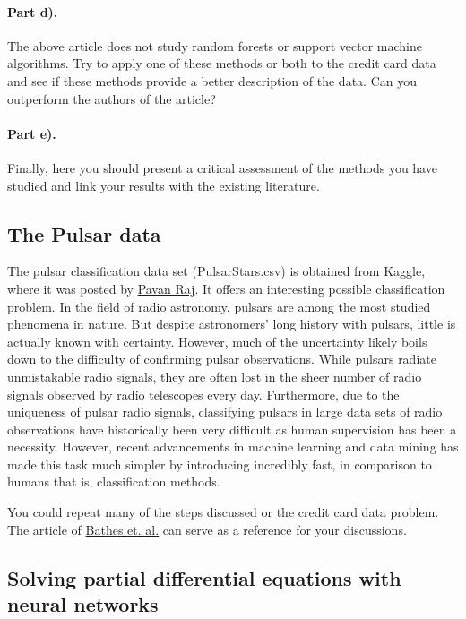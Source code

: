 \documentclass[%
oneside,                 %
final,                   %
10pt]{article}
\begin{document}
\paragraph{Part d).}
The above article does not study random forests or support vector machine algorithms. Try to apply one of these methods or both to the credit card data and see if these methods provide a better description of the data. Can you outperform the authors of the article? 

\paragraph{Part e).}
Finally, here you should present a critical assessment of the methods you have studied and link your results with the existing literature. 



\subsection{The Pulsar data}

The pulsar classification data set (PulsarStars.csv) is obtained from
Kaggle, where it was posted by \href{{https://www.kaggle.com/pavanraj159/predicting-pulsar-star-in-the-universe/notebook?scriptVersionId=4487650}}{Pavan
Raj}. It
offers an interesting possible classification problem. In the field of
radio astronomy, pulsars are among the most studied phenomena in
nature. But despite astronomers' long history with pulsars, little is
actually known with certainty. However, much of the uncertainty likely
boils down to the difficulty of confirming pulsar observations. While
pulsars radiate unmistakable radio signals, they are often lost in the
sheer number of radio signals observed by radio telescopes every
day. Furthermore, due to the uniqueness of pulsar radio signals,
classifying pulsars in large data sets of radio observations have
historically been very difficult as human supervision has been a
necessity. However, recent advancements in machine learning and data
mining has made this task much simpler by introducing incredibly fast,
in comparison to humans that is, classification methods.

You could repeat many of the steps discussed or the credit card data problem.
The article of \href{{https://arxiv.org/abs/1209.0793}}{Bathes et. al.} can serve as a reference for your discussions. 



\subsection{Solving partial differential equations with neural networks}
\end{document}
